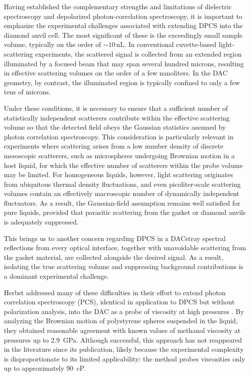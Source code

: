 Having established the complementary strengths and limitations of dielectric spectroscopy and depolarized photon-correlation spectroscopy, it is important to emphasize the experimental challenges associated with extending DPCS into the diamond anvil cell. The most significant of these is the exceedingly small sample volume, typically on the order of $\sim 10\,\si{\nano\liter}$. In conventional cuvette-based light-scattering experiments, the scattered signal is collected from an extended region illuminated by a focused beam that may span several hundred microns, resulting in effective scattering volumes on the order of a few nanoliters. In the DAC geometry, by contrast, the illuminated region is typically confined to only a few tens of microns.

Under these conditions, it is necessary to ensure that a sufficient number of statistically independent scatterers contribute within the effective scattering volume so that the detected field obeys the Gaussian statistics assumed by photon correlation spectroscopy. This consideration is particularly relevant in experiments where scattering arises from a low number density of discrete mesoscopic scatterers, such as microspheres undergoing Brownian motion in a host liquid, for which the effective number of scatterers within the probe volume may be limited. For homogeneous liquids, however, light scattering originates from ubiquitous thermal density fluctuations, and even picoliter-scale scattering volumes contain an effectively macroscopic number of dynamically independent fluctuators. As a result, the Gaussian-field assumption remains well satisfied for pure liquids, provided that parasitic scattering from the gasket or diamond anvils is adequately suppressed.

This brings us to another concern regarding DPCS in a DAC\textemdash stray spectral reflections from every optical interface, together with unavoidable scattering from the gasket material, are collected alongside the desired signal. As a result, isolating the true scattering volume and suppressing background contributions is a dominant experimental challenge.

Herbst \etal addressed many of these difficulties in their effort to extend photon correlation spectroscopy (PCS), identical in application to DPCS but without polarization analysis, into the DAC as a probe of viscosity at high pressures \nolinebreak\cite{Herbst}. By analyzing the Brownian motion of polystyrene spheres suspended in the liquid, they obtained reasonable agreement with known values of methanol viscosity at pressures up to 2.9~GPa. Although successful, this approach has not reappeared in the literature since its publication, likely because the experimental complexity is disproportionate to its limited applicability: the method probes viscosities only up to approximately 90~cP.

